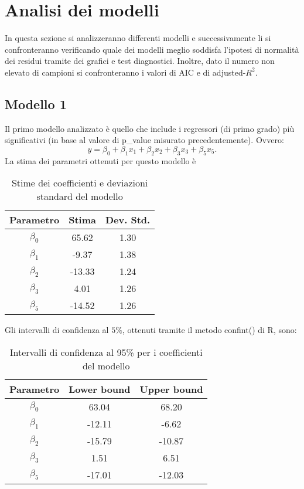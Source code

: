 \section{Analisi dei modelli}
In questa sezione si analizzeranno differenti modelli e successivamente li si confronteranno verificando quale dei modelli meglio soddisfa l'ipotesi di normalità dei residui tramite dei grafici e test diagnostici. Inoltre, dato il numero non elevato di campioni si confronteranno i valori di AIC e di adjusted-$R^2$.


\subsection{Modello 1}
Il primo modello analizzato è quello che include i regressori (di primo grado) più significativi (in base al valore di p\_value misurato precedentemente). Ovvero:
\begin{equation*}
y=\beta_0+\beta_1x_1+\beta_2x_2+\beta_3x_3+\beta_5x_5.
\end{equation*}
La stima dei parametri ottenuti per questo modello è
\begin{table}[H]
	\centering
	\begin{tabular}{|c|c|c|}
		\hline
		\textbf{Parametro} & \textbf{Stima} & \textbf{Dev. Std.} \\
		\hline
		$\beta_0$ & 65.62  & 1.30 \\
		$\beta_1$ & -9.37  & 1.38 \\
		$\beta_2$ & -13.33 & 1.24 \\
		$\beta_3$ & 4.01   & 1.26 \\
		$\beta_5$ & -14.52 & 1.26 \\
		\hline
	\end{tabular}
	\caption{Stime dei coefficienti e deviazioni standard del modello}
	\label{tab:coef_estimates}
\end{table}

Gli intervalli di confidenza al $5\%$, ottenuti tramite il metodo confint() di R, sono:
\begin{table}[H]
	\centering
	\begin{tabular}{|c|c|c|}
		\hline
		\textbf{Parametro} & \textbf{Lower bound} & \textbf{Upper bound} \\
		\hline
		$\beta_0$ & 63.04 & 68.20 \\
		$\beta_1$ & -12.11 & -6.62 \\
		$\beta_2$ & -15.79 & -10.87 \\
		$\beta_3$ & 1.51 & 6.51 \\
		$\beta_5$ & -17.01 & -12.03 \\
		\hline
	\end{tabular}
	\caption{Intervalli di confidenza al 95\% per i coefficienti del modello}
	\label{tab:ci_coefficienti}
\end{table}

